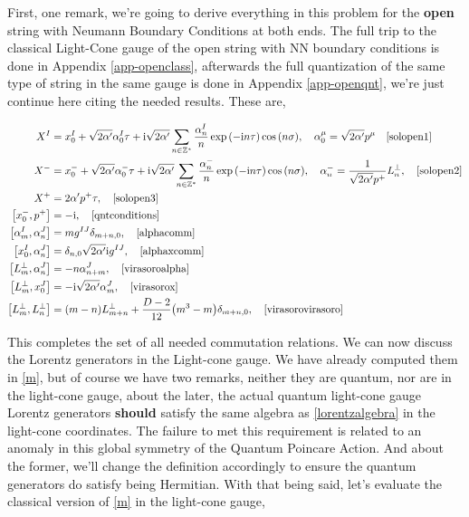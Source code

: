 \problem{}
\probitem{}

First, one remark, we're going to derive everything in this problem for the \textbf{open} string with 
Neumann Boundary Conditions at both ends. The full trip to the classical Light-Cone gauge of the open 
string with NN boundary conditions is done in Appendix \ref{app-openclass}, afterwards the full 
quantization of the same type of string in the same gauge is done in Appendix \ref{app-openqnt}, we're 
just continue here citing the needed results. These are, 

\begin{align*}
    X^I&=x_0^I+\sqrt{2\alpha'} \alpha_0^I\tau+\im\sqrt{2\alpha'}\sum\limits_{n\in\mathbb Z^\ast}\frac{\alpha_n^I}{n}\exp\qty(-\im n\tau)\cos\qty(n\sigma),\ \ \ \alpha_0^\mu=\sqrt{2\alpha'}p^\mu\ \ \ \ref{solopen1}\\
    X^-&=x_0^-+\sqrt{2\alpha'} \alpha_0^-\tau+\im\sqrt{2\alpha'}\sum\limits_{n\in\mathbb Z^\ast}\frac{\alpha_n^-}{n}\exp\qty(-\im n\tau)\cos\qty(n\sigma),\ \ \ \alpha^-_n=\frac{1}{\sqrt{2\alpha'}p^+}L^\perp_n,\ \ \ \ref{solopen2}\\
    X^+&=2\alpha'p^+\tau,\ \ \ \ref{solopen3}\\
    \comm{x_0^-}{p^+}&=-\im,\ \ \ \ref{qntconditions}\\
    \comm{\alpha_{m}^I}{\alpha_{n}^J}&=mg^{IJ}\delta_{m+n,0},\ \ \ \ref{alphacomm}\\
    \comm{x_0^I}{\alpha_{n}^J}&=\delta_{n,0}\sqrt{2\alpha'}\im g^{IJ},\ \ \ \ref{alphaxcomm}\\
    \comm{L_m^\perp}{\alpha^J_n}&=-n\alpha_{n+m}^J,\ \ \ \ref{virasoroalpha}\\
    \comm{L_m^\perp}{x_0^J}&=-\im\sqrt{2\alpha'}\alpha_m^J,\ \ \ \ref{virasorox}\\
    \comm{L_m^\perp}{L_n^\perp}&=\qty(m-n)L_{m+n}^\perp+\frac{D-2}{12}\qty(m^3-m)\delta_{m+n,0},\ \ \ \ref{virasorovirasoro}
\end{align*}

This completes the set of all needed commutation relations. We can now discuss the Lorentz generators in the Light-cone gauge. 
We have already computed them in \ref{m}, but of course we have two remarks, neither they are quantum, nor are in the light-cone gauge, 
about the later, the actual quantum light-cone gauge Lorentz generators \textbf{should} satisfy the same algebra as \ref{lorentzalgebra} in the 
light-cone coordinates. The failure to met this requirement is related to an anomaly in this global symmetry of the Quantum Poincare Action. 
And about the former, we'll change the definition accordingly to ensure the quantum generators do satisfy being Hermitian. With that being said, 
let's evaluate the classical version of \ref{m} in the light-cone gauge,

